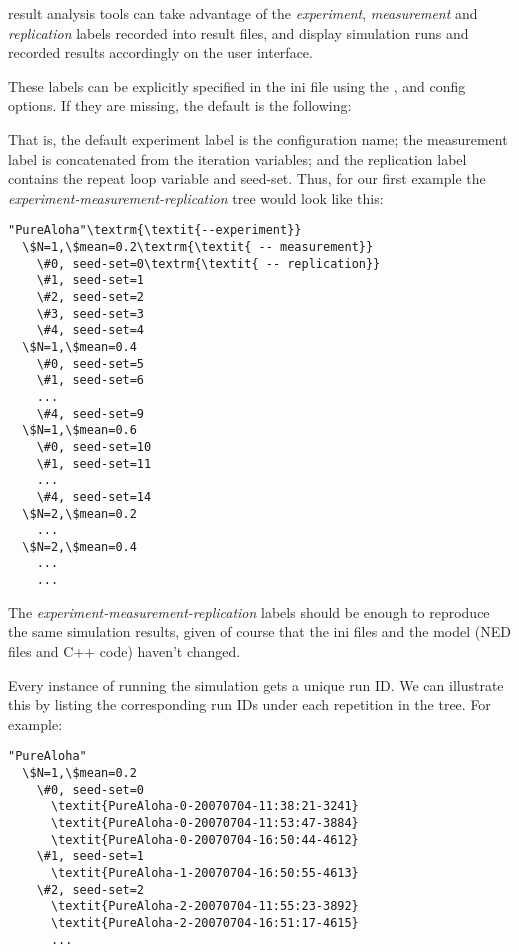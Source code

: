 {\opp} result analysis tools can take advantage of the \textit{experiment},
\textit{measurement} and \textit{replication} labels recorded into result
files, and display simulation runs and recorded results accordingly on
the user interface.

These labels can be explicitly specified in the ini file using the
,  and 
config options. If they are missing, the default is the following:


That is, the default experiment label is the configuration name; the
measurement label is concatenated from the iteration variables; and the
replication label contains the repeat loop variable and seed-set.
Thus, for our first example the \textit{experiment-measurement-replication}
tree would look like this:

\begin{Verbatim}[commandchars=\\\{\}]
"PureAloha"\textrm{\textit{--experiment}}
  \$N=1,\$mean=0.2\textrm{\textit{ -- measurement}}
    \#0, seed-set=0\textrm{\textit{ -- replication}}
    \#1, seed-set=1
    \#2, seed-set=2
    \#3, seed-set=3
    \#4, seed-set=4
  \$N=1,\$mean=0.4
    \#0, seed-set=5
    \#1, seed-set=6
    ...
    \#4, seed-set=9
  \$N=1,\$mean=0.6
    \#0, seed-set=10
    \#1, seed-set=11
    ...
    \#4, seed-set=14
  \$N=2,\$mean=0.2
    ...
  \$N=2,\$mean=0.4
    ...
    ...
\end{Verbatim}

The \textit{experiment-measurement-replication} labels should be enough to
reproduce the same simulation results, given of course that the ini
files and the model (NED files and C++ code) haven't changed.

Every instance of running the simulation gets a unique run ID. We can
illustrate this by listing the corresponding run IDs under each
repetition in the tree. For example:

\begin{Verbatim}[commandchars=\\\{\}]
"PureAloha"
  \$N=1,\$mean=0.2
    \#0, seed-set=0
      \textit{PureAloha-0-20070704-11:38:21-3241}
      \textit{PureAloha-0-20070704-11:53:47-3884}
      \textit{PureAloha-0-20070704-16:50:44-4612}
    \#1, seed-set=1
      \textit{PureAloha-1-20070704-16:50:55-4613}
    \#2, seed-set=2
      \textit{PureAloha-2-20070704-11:55:23-3892}
      \textit{PureAloha-2-20070704-16:51:17-4615}
      ...
\end{Verbatim}

